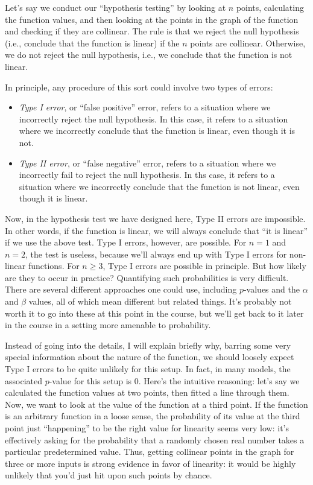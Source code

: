 \documentclass[10pt]{amsart}
\begin{document}
Let's say we conduct our ``hypothesis testing'' by looking at $n$
points, calculating the function values, and then looking at the
points in the graph of the function and checking if they are
collinear. The rule is that we reject the null hypothesis (i.e.,
conclude that the function is linear) if the $n$ points are
collinear. Otherwise, we do not reject the null hypothesis, i.e., we
conclude that the function is not linear.

In principle, any procedure of this sort could involve two types of errors:

\begin{itemize}
\item {\em Type I error}, or ``false positive'' error, refers to a
  situation where we incorrectly reject the null hypothesis. In this
  case, it refers to a situation where we incorrectly conclude that
  the function is linear, even though it is not.
\item {\em Type II error}, or ``false negative'' error, refers to a
  situation where we incorrectly fail to reject the null
  hypothesis. In ths case, it refers to a situation where we
  incorrectly conclude that the function is not linear, even though it
  is linear.
\end{itemize}

Now, in the hypothesis test we have designed here, Type II errors are
impossible. In other words, if the function is linear, we will always
conclude that ``it is linear'' if we use the above test. Type I
errors, however, are possible. For $n = 1$ and $n = 2$, the test is
useless, because we'll always end up with Type I errors for non-linear
functions. For $n \ge 3$, Type I errors are possible in principle. But
how likely are they to occur in practice? Quantifying such
probabilities is very difficult. There are several different
approaches one could use, including $p$-values and the $\alpha$ and
$\beta$ values, all of which mean different but related things. It's
probably not worth it to go into these at this point in the course,
but we'll get back to it later in the course in a setting more
amenable to probability.

Instead of going into the details, I will explain briefly why, barring
some very special information about the nature of the function, we
should loosely expect Type I errors to be quite unlikely for this
setup. In fact, in many models, the associated $p$-value for this
setup is $0$. Here's the intuitive reasoning: let's say we calculated
the function values at two points, then fitted a line through
them. Now, we want to look at the value of the function at a third
point. If the function is an arbitrary function in a loose sense, the
probability of its value at the third point just ``happening'' to be
the right value for linearity seems very low: it's effectively asking
for the probability that a randomly chosen real number takes a
particular predetermined value. Thus, getting collinear points in the
graph for three or more inputs is strong evidence in favor of
linearity: it would be highly unlikely that you'd just hit upon such
points by chance.
\end{document}
